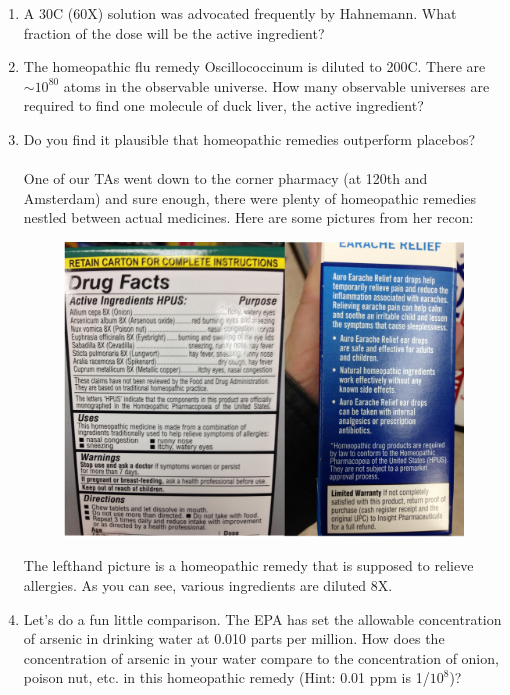 \documentclass[12pt]{article}
\begin{document}
\begin{enumerate}
\item A 30C (60X) solution was advocated frequently by Hahnemann. What fraction of the dose will be the active ingredient?

\item The homeopathic flu remedy Oscillococcinum is diluted to 200C. There are $\sim 10^{80}$ atoms in the observable universe. How many observable universes are required to find one molecule of duck liver, the active ingredient?

\item Do you find it plausible that homeopathic remedies outperform placebos?
\ \\
\ \\
\noindent One of our TAs went down to the corner pharmacy (at 120th and Amsterdam) and sure enough, there were plenty of homeopathic remedies nestled between actual medicines. Here are some pictures from her recon:
\begin{figure}[h!]
\begin{center}
\includegraphics[trim=1cm 1cm 1cm 0cm, width=4.5in]{homeo3.png}
\end{center}
\end{figure}
\noindent The lefthand picture is a homeopathic remedy that is supposed to relieve allergies. As you can see, various ingredients are diluted 8X. 


\item Let's do a fun little comparison. The EPA has set the allowable concentration of arsenic in drinking water at 0.010 parts per million. How does the concentration of arsenic in your water compare to the concentration of onion, poison nut, etc. in this homeopathic remedy (Hint: 0.01 ppm is 1/$10^8$)?
\end{enumerate}
\end{document}
